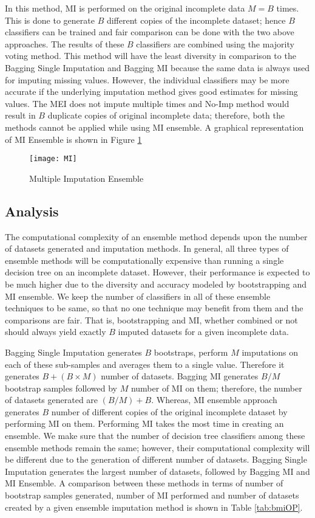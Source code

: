 \documentclass{iosart2c}
\begin{document}
In this method, MI is performed on the original incomplete data $M=B$ times. This is done to generate $B$ different copies of the incomplete dataset; hence $B$ classifiers can be trained and fair comparison can be done with the two above approaches. The results of these $B$ classifiers are combined using the majority voting method. This method will have the least diversity in comparison to the Bagging Single Imputation and Bagging MI because the same data is always used for imputing missing values. However, the individual classifiers may be more accurate if the underlying imputation method gives good estimates for missing values. The MEI does not impute multiple times and No-Imp method would result in $B$ duplicate copies of original incomplete data; therefore, both the methods cannot be applied while using MI ensemble. A graphical representation of MI Ensemble is shown in Figure \ref{fig:MI}

\begin{figure}[htb]
    \centering
    \texttt{[image: MI]}
    \caption{Multiple Imputation Ensemble}
    \label{fig:MI}
\end{figure}

\subsection{Analysis}
The computational complexity of an ensemble method depends upon the number of datasets generated and imputation methods. In general, all three types of ensemble methods will be computationally expensive than running a single decision tree on an incomplete dataset. However, their performance is expected to be much higher due to the diversity and accuracy modeled by bootstrapping and MI ensemble. We keep the number of classifiers in all of these ensemble techniques to be same, so that no one technique may benefit from them and the comparisons are fair. That is, bootstrapping and MI, whether combined or not should always yield exactly $B$ imputed datasets for a given incomplete data.

Bagging Single Imputation generates $B$ bootstraps, perform $M$ imputations on each of these sub-samples and averages them to a single value. Therefore it generates $B+(B\times M)$ number of datasets.
Bagging MI generates $B/M$ bootstrap samples followed by $M$ number of MI on them; therefore, the number of datasets generated are $(B/M) + B$. Whereas, MI ensemble approach generates $B$ number of different copies of the original incomplete dataset by performing MI on them.
Performing MI takes the most time in creating an ensemble. 
We make sure that the number of decision tree classifiers among these ensemble methods remain the same; however, their computational complexity will be different due to the generation of different number of datasets.
Bagging Single Imputation generates the largest number of datasets, followed by Bagging MI and MI Ensemble. A comparison between these methods in terms of number of bootstrap samples generated, number of MI performed and number of datasets created by a given ensemble imputation method is shown in Table \ref{tab:bmiOP}. 
\end{document}
